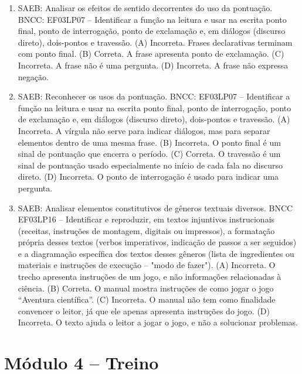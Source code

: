 \begin{enumerate}
\item
SAEB: Analisar os efeitos de sentido decorrentes do uso da pontuação.
BNCC: EF03LP07 -- Identificar a função na leitura e usar na escrita ponto
final, ponto de interrogação, ponto de exclamação e, em diálogos
(discurso direto), dois-pontos e travessão.
(A) Incorreta. Frases declarativas terminam com ponto final.
(B) Correta. A frase apresenta ponto de exclamação.
(C) Incorreta. A frase não é uma pergunta.
(D) Incorreta. A frase não expressa negação.

\item
SAEB: Reconhecer os usos da pontuação.
BNCC: EF03LP07 -- Identificar a função na leitura e usar na escrita ponto
final, ponto de interrogação, ponto de exclamação e, em diálogos
(discurso direto), dois-pontos e travessão.
(A) Incorreta. A vírgula não serve para indicar diálogos, mas para
separar elementos dentro de uma mesma frase.
(B) Incorreta. O ponto final é um sinal de pontuação que encerra o
período.
(C) Correta. O travessão é um sinal de pontuação usado especialmente no
início de cada fala no discurso direto.
(D) Incorreta. O ponto de interrogação é usado para indicar uma
pergunta.

\item
SAEB: Analisar elementos constitutivos de gêneros textuais diversos.
BNCC EF03LP16 -- Identificar e reproduzir, em textos injuntivos
instrucionais (receitas, instruções de montagem, digitais ou impressos),
a formatação própria desses textos (verbos imperativos, indicação de
passos a ser seguidos) e a diagramação específica dos textos desses
gêneros (lista de ingredientes ou materiais e instruções de execução --
"modo de fazer").
(A) Incorreta. O trecho apresenta instruções de um jogo, e não
informações relacionadas à ciência.
(B) Correta. O manual mostra instruções de como jogar o jogo ``Aventura
científica''.
(C) Incorreta. O manual não tem como finalidade convencer o leitor, já
que ele apenas apresenta instruções do jogo.
(D) Incorreta. O texto ajuda o leitor a jogar o jogo, e não a solucionar
problemas.
\end{enumerate}

\section*{Módulo 4 – Treino}

